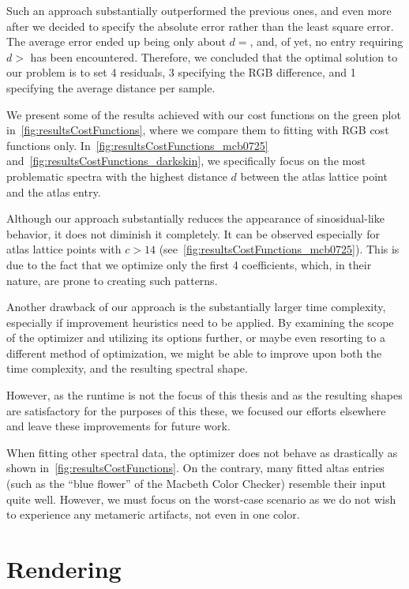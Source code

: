 Such an approach substantially outperformed the previous ones, and even more after we decided to specify the absolute error rather than the least square error. The average error ended up being only about $d = $, and, of yet, no entry requiring $d > $ has been encountered. Therefore, we concluded that the optimal solution to our problem is to set 4 residuals, 3 specifying the RGB difference, and 1 specifying the average distance per sample.

We present some of the results achieved with our cost functions on the green plot in~\cref{fig:resultsCostFunctions}, where we compare them to fitting with RGB cost functions only. In~\cref{fig:resultsCostFunctions_mcb0725} and~\cref{fig:resultsCostFunctions_darkskin}, we specifically focus on the most problematic spectra with the highest distance $d$ between the atlas lattice point and the atlas entry.

Although our approach substantially reduces the appearance of sinosidual-like behavior, it does not diminish it completely. It can be observed especially for atlas lattice points with $c > 14$ (see~\cref{fig:resultsCostFunctions_mcb0725}). This is due to the fact that we optimize only the first 4 coefficients, which, in their nature, are prone to creating such patterns.

Another drawback of our approach is the substantially larger time complexity, especially if improvement heuristics need to be applied. By examining the scope of the optimizer and utilizing its options further, or maybe even resorting to a different method of optimization, we might be able to improve upon both the time complexity, and the resulting spectral shape.

However, as the runtime is not the focus of this thesis and as the resulting shapes are satisfactory for the purposes of this these, we focused our efforts elsewhere and leave these improvements for future work.

When fitting other spectral data, the optimizer does not behave as drastically as shown in~\cref{fig:resultsCostFunctions}. On the contrary, many fitted altas entries (such as the ``blue flower'' of the Macbeth Color Checker) resemble their input quite well. However, we must focus on the worst-case scenario as we do not wish to experience any metameric artifacts, not even in one color.

\section{Rendering}

